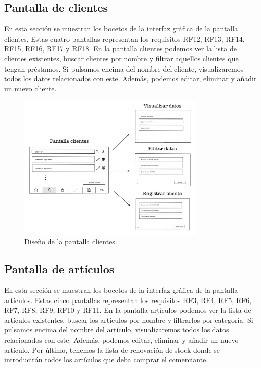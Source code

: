 \newpage

\subsection{Pantalla de clientes}

En esta sección se muestran los bocetos de la interfaz gráfica de la pantalla clientes. Estas cuatro pantallas representan los requisitos RF12, RF13, RF14, RF15, RF16, RF17 y RF18. En la pantalla clientes podemos ver la lista de clientes existentes, buscar clientes por nombre y filtrar aquellos clientes que tengan préstamos. Si pulsamos encima del nombre del cliente, visualizaremos todos los datos relacionados con este. Además, podemos editar, eliminar y añadir un nuevo cliente. 


\begin{figure}[ht]
	\centering
	\includegraphics[width=0.8\textwidth, angle=270]{imagenes/pantalla_clientes.JPG}
	\caption{Diseño de la pantalla clientes.}
	\label{fig:pantallaclientes}
\end{figure}

\newpage

\subsection{Pantalla de artículos}

En esta sección se muestran los bocetos de la interfaz gráfica de la pantalla artículos. Estas cinco pantallas representan los requisitos RF3, RF4, RF5, RF6, RF7, RF8, RF9, RF10 y RF11. En la pantalla artículos podemos ver la lista de artículos existentes, buscar los artículos por nombre y filtrarlos por categoría. Si pulsamos encima del nombre del artículo, visualizaremos todos los datos relacionados con este. Además, podemos editar, eliminar y añadir un nuevo artículo. Por último, tenemos la lista de renovación de stock donde se introducirán todos los artículos que deba comprar el comerciante. 


